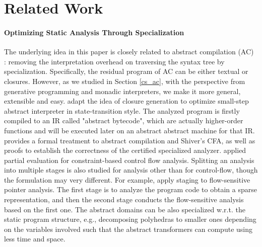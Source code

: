 \section{Related Work}

\paragraph{Optimizing Static Analysis Through Specialization}
The underlying idea in this paper is closely related to abstract compilation (AC)
\cite{Boucher:1996:ACN:647473.727587}: removing the interpretation overhead on
traversing the syntax tree by specialization. Specifically, the residual program
of AC can be either textual or closures. However, as we studied in Section
\ref{cs_ac}, with the perspective from generative programming and monadic
interpreters, we make it more general, extensible and easy.
\citet{Johnson:2013:OAA:2500365.2500604} adapt the idea of closure
generation to optimize small-step abstract interpreter in state-transition
style. The analyzed program is firstly compiled to an IR called "abstract
bytecode", which are actually higher-order functions and will be executed later
on an abstract abstract machine for that IR. \citet{damian1999partial} provides a
formal treatment to abstract compilation and Shiver's CFA, as well as proofs to
establish the correctness of the certified specialized analyzer.
\citet{amtoft1999partial} applied partial evaluation for constraint-based
control flow analysis. Splitting an analysis into multiple stages is also
studied for analysis other than for control-flow, though the formulation may
very different. For example, \citet{DBLP:conf/cgo/HardekopfL11} apply staging to
flow-sensitive pointer analysis. The first stage is to analyze the program code
to obtain a sparse representation, and then the second stage conducts the
flow-sensitive analysis based on the first one.
The abstract domains can be also specialized w.r.t. the static program
structure, e.g., decomposing polyhedras \cite{DBLP:conf/popl/SinghPV17,
Singh:2017:PCD:3177123.3158143} to smaller ones depending on the variables
involved such that the abstract transformers can compute using less time and
space.

